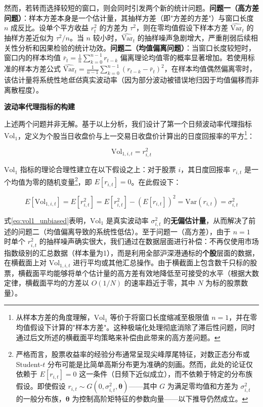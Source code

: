\documentclass{article}
\begin{document}
然而，若转而选择较短的窗口，则会同时引发两个新的统计问题。\textbf{问题一（高方差问题）}：样本方差本身是一个估计量，其抽样方差（即"方差的方差"）与窗口长度 $n$ 成反比。设单个平方收益 $r_t^2$ 的方差为 $\tau^2$，则在零均值假设下样本方差 $\widehat{\text{Var}}_t$ 的抽样方差近似为 $\tau^2 / n$。当 $n$ 较小时，$\widehat{\text{Var}}_t$ 的抽样噪声急剧增大，严重削弱后续相关性分析和因果检验的统计功效。\textbf{问题二（均值偏离问题）}：当窗口长度较短时，窗口内的样本均值 $\bar{r}_t = \frac{1}{n}\sum_{k=0}^{n-1}r_{t-k}$ 偏离理论均值零的概率显著增加。若使用标准的样本方差公式 $\widehat{\text{Var}}_t = \frac{1}{n-1}\sum_{k=0}^{n-1}(r_{t-k} - \bar{r}_t)^2$，在样本均值偶然偏离零时，该估计量将系统性地\textit{低估}真实波动率（因为部分波动被错误地归因于均值偏移而非离散程度）。

\vspace{0.5em}
\noindent\textbf{波动率代理指标的构建}

上述两个问题并非无解。基于以上分析，我们设计了第一个日频波动率代理指标 $\text{Vol}_1$，定义为个股当日收盘价与上一交易日收盘价计算出的日度回报率的平方\footnote{从样本方差的角度理解，$\text{Vol}_1$ 等价于将窗口长度缩减至极限值 $n = 1$，并在零均值假设下计算的"样本方差"。这种极端化处理彻底消除了滞后性问题，同时通过后文所述的横截面平均策略来补偿由此带来的高方差问题。}：

\begin{equation}
    \text{Vol}_{1,i,t} = r_{i,t}^2
    \label{eq:vol1}
\end{equation}

$\text{Vol}_1$ 指标的理论合理性建立在以下假设之上：对于股票 $i$，其日度回报率 $r_{i,t}$ 是一个均值为零的随机变量\footnote{严格而言，股票收益率的经验分布通常呈现尖峰厚尾特征，对数正态分布或 Student-$t$ 分布可能是比简单高斯分布更为准确的刻画。然而，此处的论证仅依赖于 $E[r_{i,t}] = 0$ 这一条件（日频下近似成立），而不依赖于特定的分布族假设。即使假设 $r_{i,t} \sim G(0, \sigma_{i,t}^2, \boldsymbol{\theta})$——其中 $G$ 为满足零均值和方差为 $\sigma_{i,t}^2$ 的一般分布族，$\boldsymbol{\theta}$ 为控制高阶矩特征的参数向量——以下推导仍然成立。}，即 $E[r_{i,t}] = 0$。在此假设下：

\begin{equation}
    E[\text{Vol}_{1,i,t}] = E[r_{i,t}^2] = E[r_{i,t}^2] - (E[r_{i,t}])^2 = \text{Var}(r_{i,t}) = \sigma_{i,t}^2
    \label{eq:vol1_unbiased}
\end{equation}

\noindent 式\ref{eq:vol1_unbiased}表明，$\text{Vol}_1$ 是真实波动率 $\sigma_{i,t}^2$ 的\textbf{无偏估计量}，从而解决了前述的问题二（均值偏离导致的系统性低估）。至于问题一（高方差），由于 $n = 1$ 时单个 $r_{i,t}^2$ 的抽样噪声确实很大，我们通过在数据层面进行补偿：不再仅使用市场指数级别的汇总数据（样本量为1），而是利用全部沪深港通标的\textbf{个股}层面的数据，在横截面上对 $\text{Vol}_{1,i,t}$ 进行平均或其他汇总操作。由于横截面上包含数千只标的股票，横截面平均能够将单个估计量的高方差有效地降低至可接受的水平（根据大数定律，横截面平均的方差以 $O(1/N)$ 的速率趋近于零，其中 $N$ 为标的股票数量）。
\end{document}
